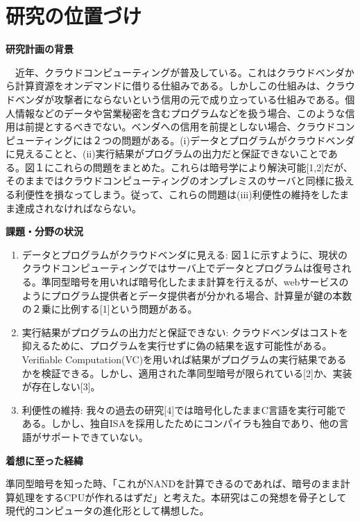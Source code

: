 
\section{研究の位置づけ}

\textbf{研究計画の背景}

　近年、クラウドコンピューティングが普及している。これはクラウドベンダから計算資源をオンデマンドに借りる仕組みである。しかしこの仕組みは、クラウドベンダが攻撃者にならないという信用の元で成り立っている仕組みである。個人情報などのデータや営業秘密を含むプログラムなどを扱う場合、このような信用は前提とするべきでない。ベンダへの信用を前提としない場合、クラウドコンピューティングには２つの問題がある。(i)データとプログラムがクラウドベンダに見えることと、(ii)実行結果がプログラムの出力だと保証できないことである。図１にこれらの問題をまとめた。これらは暗号学により解決可能[1,2]だが、そのままではクラウドコンピューティングのオンプレミスのサーバと同様に扱える利便性を損なってしまう。従って、これらの問題は(iii)利便性の維持をしたまま達成されなければならない。

\textbf{課題・分野の状況}
\begin{enumerate}
    \item データとプログラムがクラウドベンダに見える: 図１に示すように、現状のクラウドコンピューティングではサーバ上でデータとプログラムは復号される。準同型暗号を用いれば暗号化したまま計算を行えるが、webサービスのようにプログラム提供者とデータ提供者が分かれる場合、計算量が鍵の本数の２乗に比例する[1]という問題がある。
    \item 実行結果がプログラムの出力だと保証できない: クラウドベンダはコストを抑えるために、プログラムを実行せずに偽の結果を返す可能性がある。Verifiable Computation(VC)を用いれば結果がプログラムの実行結果であるかを検証できる。しかし、適用された準同型暗号が限られている[2]か、実装が存在しない[3]。
    \item 利便性の維持: 我々の過去の研究[4]では暗号化したままC言語を実行可能である。しかし、独自ISAを採用したためにコンパイラも独自であり、他の言語がサポートできていない。
\end{enumerate}

\textbf{着想に至った経緯}

準同型暗号を知った時、「これがNANDを計算できるのであれば、暗号のまま計算処理をするCPUが作れるはずだ」と考えた。本研究はこの発想を骨子として現代的コンピュータの進化形として構想した。



